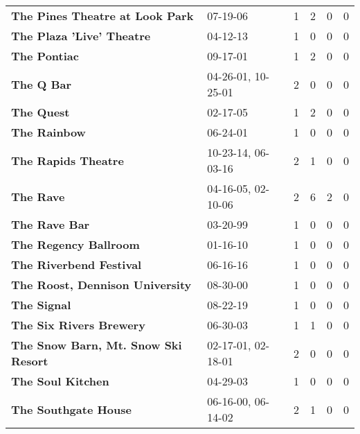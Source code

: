 \begin{supertabular}{p{0.4\textwidth}p{0.3\textwidth}p{0.05\textwidth}p{0.05\textwidth}p{0.05\textwidth}p{0.05\textwidth}}
                              \textbf{The Pines Theatre at Look Park} &            07-19-06 &  1 &  2 &  0 &  0 \\
                                    \textbf{The Plaza 'Live' Theatre} &            04-12-13 &  1 &  0 &  0 &  0 \\
                                                 \textbf{The Pontiac} &            09-17-01 &  1 &  2 &  0 &  0 \\
                                                   \textbf{The Q Bar} &  04-26-01, 10-25-01 &  2 &  0 &  0 &  0 \\
                                                   \textbf{The Quest} &            02-17-05 &  1 &  2 &  0 &  0 \\
                                                 \textbf{The Rainbow} &            06-24-01 &  1 &  0 &  0 &  0 \\
                                          \textbf{The Rapids Theatre} &  10-23-14, 06-03-16 &  2 &  1 &  0 &  0 \\
                                                    \textbf{The Rave} &  04-16-05, 02-10-06 &  2 &  6 &  2 &  0 \\
                                                \textbf{The Rave Bar} &            03-20-99 &  1 &  0 &  0 &  0 \\
                                        \textbf{The Regency Ballroom} &            01-16-10 &  1 &  0 &  0 &  0 \\
                                      \textbf{The Riverbend Festival} &            06-16-16 &  1 &  0 &  0 &  0 \\
                              \textbf{The Roost, Dennison University} &            08-30-00 &  1 &  0 &  0 &  0 \\
                                                  \textbf{The Signal} &            08-22-19 &  1 &  0 &  0 &  0 \\
                                      \textbf{The Six Rivers Brewery} &            06-30-03 &  1 &  1 &  0 &  0 \\
                          \textbf{The Snow Barn, Mt. Snow Ski Resort} &  02-17-01, 02-18-01 &  2 &  0 &  0 &  0 \\
                                            \textbf{The Soul Kitchen} &            04-29-03 &  1 &  0 &  0 &  0 \\
                                         \textbf{The Southgate House} &  06-16-00, 06-14-02 &  2 &  1 &  0 &  0 \\

\end{supertabular}
